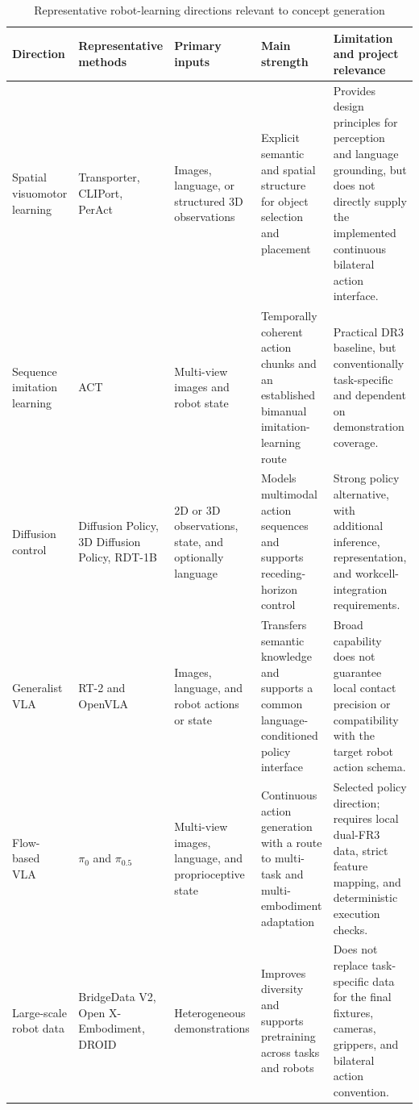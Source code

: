\begin{table}[!htbp]
\centering
\caption{Representative robot-learning directions relevant to concept generation}
\label{tab:learning-policy-landscape}
\scriptsize
\renewcommand{\arraystretch}{1.12}
\begin{tabularx}{\textwidth}{
  >{\raggedright\arraybackslash}p{}
  >{\raggedright\arraybackslash}p{}
  >{\raggedright\arraybackslash}p{}
  >{\raggedright\arraybackslash}p{}
  X}
\toprule
\textbf{Direction} & \textbf{Representative methods} & \textbf{Primary inputs} & \textbf{Main strength} & \textbf{Limitation and project relevance} \\
\midrule
Spatial visuomotor learning & Transporter, CLIPort, PerAct~\cite{transporter,cliport,peract} & Images, language, or structured 3D observations & Explicit semantic and spatial structure for object selection and placement & Provides design principles for perception and language grounding, but does not directly supply the implemented continuous bilateral action interface. \\
\midrule
Sequence imitation learning & ACT~\cite{act} & Multi-view images and robot state & Temporally coherent action chunks and an established bimanual imitation-learning route & Practical DR3 baseline, but conventionally task-specific and dependent on demonstration coverage. \\
\midrule
Diffusion control & Diffusion Policy, 3D Diffusion Policy, RDT-1B~\cite{diffusionpolicy,dp3,rdt1b} & 2D or 3D observations, state, and optionally language & Models multimodal action sequences and supports receding-horizon control & Strong policy alternative, with additional inference, representation, and workcell-integration requirements. \\
\midrule
Generalist VLA & RT-2 and OpenVLA~\cite{rt2,openvla} & Images, language, and robot actions or state & Transfers semantic knowledge and supports a common language-conditioned policy interface & Broad capability does not guarantee local contact precision or compatibility with the target robot action schema. \\
\midrule
Flow-based VLA & $\pi_0$ and $\pi_{0.5}$~\cite{pi0,pi05} & Multi-view images, language, and proprioceptive state & Continuous action generation with a route to multi-task and multi-embodiment adaptation & Selected policy direction; requires local dual-FR3 data, strict feature mapping, and deterministic execution checks. \\
\midrule
Large-scale robot data & BridgeData V2, Open X-Embodiment, DROID~\cite{bridgev2,openx,droid} & Heterogeneous demonstrations & Improves diversity and supports pretraining across tasks and robots & Does not replace task-specific data for the final fixtures, cameras, grippers, and bilateral action convention. \\
\bottomrule
\end{tabularx}
\end{table}

